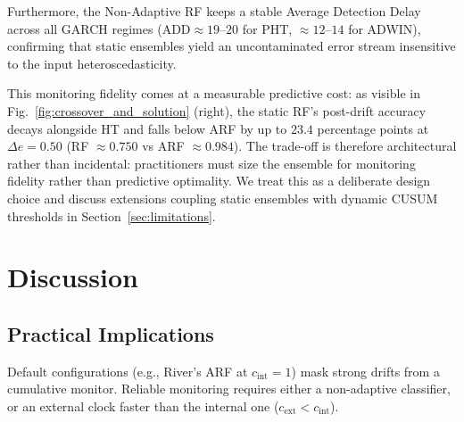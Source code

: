 \documentclass[10pt,conference]{IEEEtran}
\theoremstyle{definition}
\begin{document}
Furthermore, the Non-Adaptive RF keeps a stable Average Detection Delay across all GARCH regimes ($\mathrm{ADD} \approx 19$--$20$ for PHT, $\approx 12$--$14$ for ADWIN), confirming that static ensembles yield an uncontaminated error stream insensitive to the input heteroscedasticity.

This monitoring fidelity comes at a measurable predictive cost: as visible in Fig.~\ref{fig:crossover_and_solution} (right), the static RF's post-drift accuracy decays alongside HT and falls below ARF by up to $23.4$ percentage points at $\Delta e = 0.50$ (RF $\approx 0.750$ vs ARF $\approx 0.984$). The trade-off is therefore architectural rather than incidental: practitioners must size the ensemble for monitoring fidelity rather than predictive optimality. We treat this as a deliberate design choice and discuss extensions coupling static ensembles with dynamic CUSUM thresholds in Section~\ref{sec:limitations}.

\section{Discussion}\label{sec:discussion}

\subsection{Practical Implications}
Default configurations (e.g., River's ARF at $c_{\mathrm{int}} = 1$) mask strong drifts from a cumulative monitor. Reliable monitoring requires either a non-adaptive classifier, or an external clock faster than the internal one ($c_{\mathrm{ext}} < c_{\mathrm{int}}$).
\end{document}
